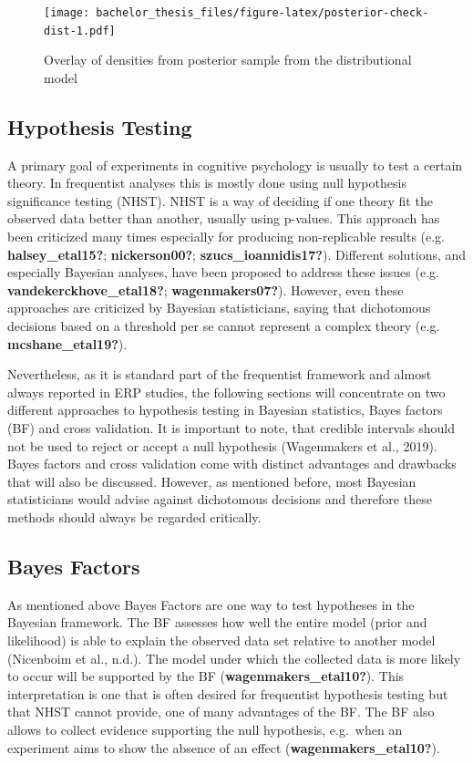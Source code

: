 \documentclass[
  doc,12pt,floatsintext]{apa7}
\begin{document}
\begin{figure}
\centering
\texttt{[image: bachelor\_thesis\_files/figure-latex/posterior-check-dist-1.pdf]}
\caption{\label{fig:posterior-check-dist}Overlay of densities from posterior sample from the distributional model}
\end{figure}

\subsection{Hypothesis Testing}\label{hypothesis-testing}

A primary goal of experiments in cognitive psychology is usually to test a certain theory. In frequentist analyses this is mostly done using null hypothesis significance testing (NHST). NHST is a way of deciding if one theory fit the observed data better than another, usually using p-values. This approach has been criticized many times especially for producing non-replicable results (e.g. \textbf{halsey\_etal15?}; \textbf{nickerson00?}; \textbf{szucs\_ioannidis17?}). Different solutions, and especially Bayesian analyses, have been proposed to address these issues (e.g. \textbf{vandekerckhove\_etal18?}; \textbf{wagenmakers07?}). However, even these approaches are criticized by Bayesian statisticians, saying that dichotomous decisions based on a threshold per se cannot represent a complex theory (e.g. \textbf{mcshane\_etal19?}).

Nevertheless, as it is standard part of the frequentist framework and almost always reported in ERP studies, the following sections will concentrate on two different approaches to hypothesis testing in Bayesian statistics, Bayes factors (BF) and cross validation. It is important to note, that credible intervals should not be used to reject or accept a null hypothesis (Wagenmakers et al., 2019). Bayes factors and cross validation come with distinct advantages and drawbacks that will also be discussed. However, as mentioned before, most Bayesian statisticians would advise against dichotomous decisions and therefore these methods should always be regarded critically.

\subsection{Bayes Factors}\label{bayes-factors}

As mentioned above Bayes Factors are one way to test hypotheses in the Bayesian framework. The BF assesses how well the entire model (prior and likelihood) is able to explain the observed data set relative to another model (Nicenboim et al., n.d.). The model under which the collected data is more likely to occur will be supported by the BF (\textbf{wagenmakers\_etal10?}). This interpretation is one that is often desired for frequentist hypothesis testing but that NHST cannot provide, one of many advantages of the BF. The BF also allows to collect evidence supporting the null hypothesis, e.g.~when an experiment aims to show the absence of an effect (\textbf{wagenmakers\_etal10?}).
\end{document}
